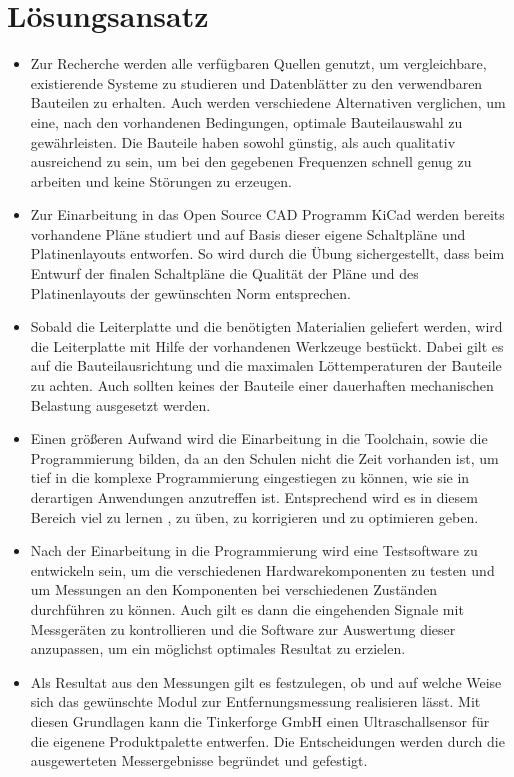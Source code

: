 \section{Lösungsansatz}
\begin{itemize}
\item Zur Recherche werden alle verfügbaren Quellen genutzt, um vergleichbare, existierende Systeme zu studieren und Datenblätter zu den verwendbaren Bauteilen zu erhalten. Auch werden verschiedene Alternativen verglichen, um eine, nach den vorhandenen Bedingungen, optimale Bauteilauswahl zu gewährleisten. Die Bauteile haben sowohl günstig, als auch qualitativ ausreichend zu sein, um bei den gegebenen Frequenzen schnell genug zu arbeiten und keine Störungen zu erzeugen.
\item Zur Einarbeitung in das Open Source CAD Programm KiCad werden bereits vorhandene Pläne studiert und auf Basis dieser eigene Schaltpläne und Platinenlayouts entworfen. So wird durch die Übung sichergestellt, dass beim Entwurf der finalen Schaltpläne die Qualität der Pläne und des Platinenlayouts der gewünschten Norm entsprechen.
\item Sobald die Leiterplatte und die benötigten Materialien geliefert werden, wird die Leiterplatte mit Hilfe der vorhandenen Werkzeuge bestückt. Dabei gilt es auf die Bauteilausrichtung und die maximalen Löttemperaturen der Bauteile zu achten. Auch sollten keines der Bauteile einer dauerhaften mechanischen Belastung ausgesetzt werden.
\item Einen größeren Aufwand wird die Einarbeitung in die Toolchain, sowie die Programmierung bilden, da an den Schulen nicht die Zeit vorhanden ist, um tief in die komplexe Programmierung eingestiegen zu können, wie sie in derartigen Anwendungen anzutreffen ist. Entsprechend wird es in diesem Bereich viel zu lernen , zu üben, zu korrigieren und zu optimieren geben.
\item Nach der Einarbeitung in die Programmierung wird eine Testsoftware zu entwickeln sein, um die verschiedenen Hardwarekomponenten zu testen und um Messungen an den Komponenten bei verschiedenen Zuständen durchführen zu können. Auch gilt es dann die eingehenden Signale mit Messgeräten zu kontrollieren und die Software zur Auswertung dieser anzupassen, um ein möglichst optimales Resultat zu erzielen.
\item Als Resultat aus den Messungen gilt es festzulegen, ob und auf welche Weise sich das gewünschte Modul zur Entfernungsmessung realisieren lässt. Mit diesen Grundlagen kann die Tinkerforge GmbH einen  Ultraschallsensor für die eigenene Produktpalette entwerfen. Die Entscheidungen werden durch die ausgewerteten Messergebnisse begründet und gefestigt.
\end{itemize}
